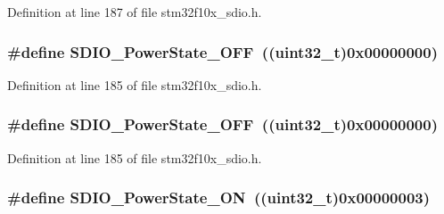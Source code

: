 Definition at line 187 of file stm32f10x\+\_\+sdio.\+h.

\subsubsection[{\texorpdfstring{S\+D\+I\+O\+\_\+\+Power\+State\+\_\+\+O\+FF}{SDIO_PowerState_OFF}}]{\setlength{\rightskip}{0pt plus 5cm}\#define S\+D\+I\+O\+\_\+\+Power\+State\+\_\+\+O\+FF~(({\bf uint32\+\_\+t})0x00000000)}\hypertarget{group___s_d_i_o___power___state_gab2f36a68fc50795ea74a7e98b4ac2d37}{}\label{group___s_d_i_o___power___state_gab2f36a68fc50795ea74a7e98b4ac2d37}


Definition at line 185 of file stm32f10x\+\_\+sdio.\+h.

\subsubsection[{\texorpdfstring{S\+D\+I\+O\+\_\+\+Power\+State\+\_\+\+O\+FF}{SDIO_PowerState_OFF}}]{\setlength{\rightskip}{0pt plus 5cm}\#define S\+D\+I\+O\+\_\+\+Power\+State\+\_\+\+O\+FF~(({\bf uint32\+\_\+t})0x00000000)}\hypertarget{group___s_d_i_o___power___state_gab2f36a68fc50795ea74a7e98b4ac2d37}{}\label{group___s_d_i_o___power___state_gab2f36a68fc50795ea74a7e98b4ac2d37}


Definition at line 185 of file stm32f10x\+\_\+sdio.\+h.

\subsubsection[{\texorpdfstring{S\+D\+I\+O\+\_\+\+Power\+State\+\_\+\+ON}{SDIO_PowerState_ON}}]{\setlength{\rightskip}{0pt plus 5cm}\#define S\+D\+I\+O\+\_\+\+Power\+State\+\_\+\+ON~(({\bf uint32\+\_\+t})0x00000003)}\hypertarget{group___s_d_i_o___power___state_ga0aacd8c94effe8066c6d447fc884d217}{}\label{group___s_d_i_o___power___state_ga0aacd8c94effe8066c6d447fc884d217}


